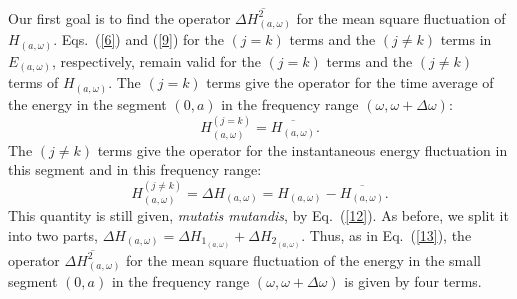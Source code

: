 \documentclass{elsart}
\begin{document}
Our first goal is to find the operator $\overline{\Delta H_{(a, \omega)}^2}$ for the mean square fluctuation of $H_{(a, \omega)}$. Eqs.\ (\ref{6}) and (\ref{9}) for the $(j=k)$ terms and the $(j \neq k)$ terms in $E_{(a, \omega)}$, respectively, remain valid for the $(j=k)$ terms and the $(j \neq k)$ terms of $H_{(a, \omega)}$. The $(j=k)$ terms give the operator for the time average of the energy in the segment $(0, a)$  in the frequency range $(\omega, \omega + \Delta \omega)$:
\begin{equation}
H_{(a, \omega)}^{(j=k)} = \overline{H_{(a, \omega)}}.
\label{q6a}
\end{equation}
The $(j \neq k)$ terms  give the operator for the instantaneous energy fluctuation in this segment and in this frequency range:
\begin{equation}
H_{(a, \omega)}^{(j \neq k)} = \Delta H_{(a, \omega)} =  H_{(a, \omega)} - \overline{H_{(a, \omega)}}.
\label{q7}
\end{equation}
This quantity is still given, {\it mutatis mutandis}, by Eq.\ (\ref{12}). As before, we split it into two parts, $\Delta H_{(a, \omega)} = \Delta H_{1_{(a, \omega)}} + \Delta H_{2_{(a, \omega)}}$. Thus, as in Eq.\ (\ref{13}), the operator $\overline{\Delta H_{(a, \omega)}^2}$ for the mean square fluctuation of the energy in the small segment $(0, a)$ in the frequency range $(\omega, \omega + \Delta \omega)$ is given by four terms.
\end{document}
